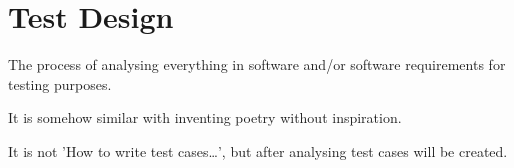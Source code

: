 \section{Test Design}
\label{sec:Test Design}

The process of analysing everything in software and/or software requirements for testing purposes.

It is somehow similar with inventing poetry without inspiration.

It is not 'How to write test cases\ldots', but after analysing test cases will be created.
